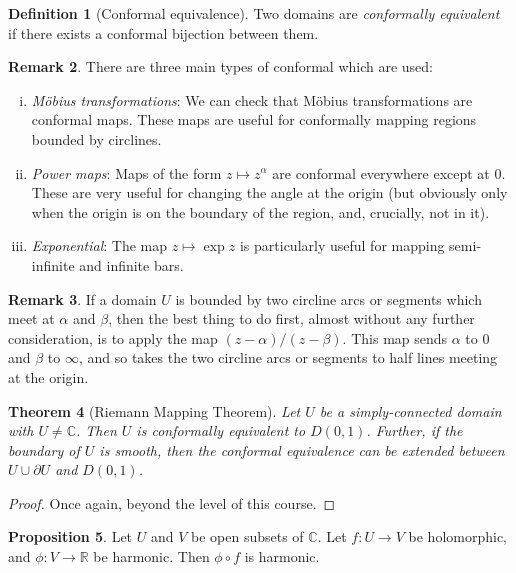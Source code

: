 \documentclass[10pt,fleqn]{article}
\newcommand{\comps}{\mathbb{C}}
\newcommand{\reals}{\mathbb{R}}
\theoremstyle{definition} \newtheorem{defn}{Definition}[section]
\theoremstyle{plain}      \newtheorem{thm}[defn]{Theorem}
\theoremstyle{definition} \newtheorem{prop}[defn]{Proposition}
\theoremstyle{plain}      \newtheorem{lem}[defn]{Lemma}
\theoremstyle{definition} \newtheorem{cor}[defn]{Corollary}
\theoremstyle{definition} \newtheorem{ex}[defn]{Example}
\theoremstyle{definition} \newtheorem{rem}[defn]{Remark}
\begin{document}
\begin{defn}[Conformal equivalence]
    Two domains are \emph{conformally equivalent} if there exists a conformal bijection between them.
\end{defn}

\begin{rem}
    There are three main types of conformal which are used:
    \begin{enumerate}[(i)]
        \item \emph{M\"obius transformations}:
        We can check that M\"obius transformations are conformal maps.
        These maps are useful for conformally mapping regions bounded by circlines.
        \item \emph{Power maps}:
        Maps of the form $z\mapsto z^{\alpha}$ are conformal everywhere except at $0$.
        These are very useful for changing the angle at the origin (but obviously only when the origin is on the boundary of the region, and, crucially, not in it).
        \item \emph{Exponential}:
        The map $z\mapsto\exp z$ is particularly useful for mapping semi-infinite and infinite bars.
    \end{enumerate}
\end{rem}

\begin{rem}
    If a domain $U$ is bounded by two circline arcs or segments which meet at $\alpha$ and $\beta$, then the best thing to do first, almost without any further consideration, is to apply the map $(z-\alpha)/(z-\beta)$.
    This map sends $\alpha$ to $0$ and $\beta$ to $\infty$, and so takes the two circline arcs or segments to half lines meeting at the origin.
\end{rem}

\begin{thm}[Riemann Mapping Theorem]
    Let $U$ be a simply-connected domain with $U\neq\comps$.
    Then $U$ is conformally equivalent to $D(0,1)$.
    Further, if the boundary of $U$ is smooth, then the conformal equivalence can be extended between $U\cup\partial U$ and $D(0,1)$.
\end{thm}

\begin{proof}
    Once again, beyond the level of this course.
\end{proof}

\begin{prop}
    Let $U$ and $V$ be open subsets of $\comps$.
    Let $f:U\to V$ be holomorphic, and $\phi:V\to\reals$ be harmonic.
    Then $\phi\circ f$ is harmonic.
\end{prop}
\end{document}
